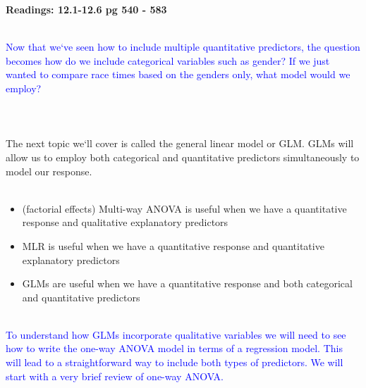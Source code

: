 \begin{center}\large\textbf{Readings: 12.1-12.6 pg 540 - 583}\\
\normalsize \end{center}
\large ~\hrulefill
~\\
\textcolor{blue}{Now that we`ve seen how to include multiple quantitative predictors, the question becomes how do we include categorical variables such as gender?  If we just wanted to compare race times based on the genders only, what model would we employ?}\\~\\~\\~\\

The next topic we`ll cover is called the general linear model or GLM.  GLMs will allow us to employ both categorical and quantitative predictors simultaneously to model our response.\\~\\

\begin{itemize}
\item (factorial effects) Multi-way ANOVA is useful when we have a quantitative response and qualitative explanatory predictors
\item MLR is useful when we have a quantitative response and quantitative explanatory predictors
\item GLMs are useful when we have a quantitative response and both categorical and quantitative predictors
\end{itemize}

~\\

\textcolor{blue}{To understand how GLMs incorporate qualitative variables we will need to see how to write the one-way ANOVA model in terms of a regression model.  This will lead to a straightforward way to include both types of predictors.  We will start with a very brief review of one-way ANOVA.}

\newpage

